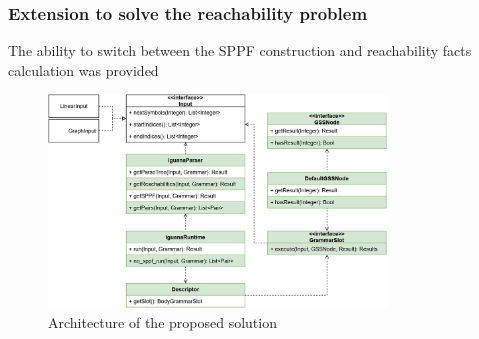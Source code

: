 \documentclass{beamer}
\begin{document}
 
 
  \begin{frame}
   \transwipe[direction=90]
 \frametitle{Extension to solve the reachability problem}
 The ability to switch between the SPPF construction and reachability facts calculation was provided
 \begin{figure}[ht]
    \centering
    \includegraphics[width=0.8\textwidth]{pics/sppf_arch.jpg}
    \caption{Architecture of the proposed solution}
    \label{fig:solution_architecture}
\end{figure}
  \end{frame}
  
\end{document}
